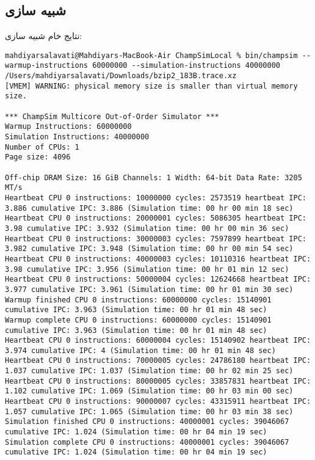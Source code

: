 \documentclass[17pt]{article}
\begin{document}
\subsection{شبیه سازی}
نتایج خام شبیه سازی:

\begin{LTR}
\begin{lstlisting}[basicstyle=\tiny\ttfamily]
mahdiyarsalavati@Mahdiyars-MacBook-Air ChampSimLocal % bin/champsim --warmup-instructions 60000000 --simulation-instructions 40000000 /Users/mahdiyarsalavati/Downloads/bzip2_183B.trace.xz
[VMEM] WARNING: physical memory size is smaller than virtual memory size.

*** ChampSim Multicore Out-of-Order Simulator ***
Warmup Instructions: 60000000
Simulation Instructions: 40000000
Number of CPUs: 1
Page size: 4096

Off-chip DRAM Size: 16 GiB Channels: 1 Width: 64-bit Data Rate: 3205 MT/s
Heartbeat CPU 0 instructions: 10000000 cycles: 2573519 heartbeat IPC: 3.886 cumulative IPC: 3.886 (Simulation time: 00 hr 00 min 18 sec)
Heartbeat CPU 0 instructions: 20000001 cycles: 5086305 heartbeat IPC: 3.98 cumulative IPC: 3.932 (Simulation time: 00 hr 00 min 36 sec)
Heartbeat CPU 0 instructions: 30000003 cycles: 7597899 heartbeat IPC: 3.982 cumulative IPC: 3.948 (Simulation time: 00 hr 00 min 54 sec)
Heartbeat CPU 0 instructions: 40000003 cycles: 10110316 heartbeat IPC: 3.98 cumulative IPC: 3.956 (Simulation time: 00 hr 01 min 12 sec)
Heartbeat CPU 0 instructions: 50000004 cycles: 12624668 heartbeat IPC: 3.977 cumulative IPC: 3.961 (Simulation time: 00 hr 01 min 30 sec)
Warmup finished CPU 0 instructions: 60000000 cycles: 15140901 cumulative IPC: 3.963 (Simulation time: 00 hr 01 min 48 sec)
Warmup complete CPU 0 instructions: 60000000 cycles: 15140901 cumulative IPC: 3.963 (Simulation time: 00 hr 01 min 48 sec)
Heartbeat CPU 0 instructions: 60000004 cycles: 15140902 heartbeat IPC: 3.974 cumulative IPC: 4 (Simulation time: 00 hr 01 min 48 sec)
Heartbeat CPU 0 instructions: 70000005 cycles: 24786180 heartbeat IPC: 1.037 cumulative IPC: 1.037 (Simulation time: 00 hr 02 min 25 sec)
Heartbeat CPU 0 instructions: 80000005 cycles: 33857831 heartbeat IPC: 1.102 cumulative IPC: 1.069 (Simulation time: 00 hr 03 min 00 sec)
Heartbeat CPU 0 instructions: 90000007 cycles: 43315911 heartbeat IPC: 1.057 cumulative IPC: 1.065 (Simulation time: 00 hr 03 min 38 sec)
Simulation finished CPU 0 instructions: 40000001 cycles: 39046067 cumulative IPC: 1.024 (Simulation time: 00 hr 04 min 19 sec)
Simulation complete CPU 0 instructions: 40000001 cycles: 39046067 cumulative IPC: 1.024 (Simulation time: 00 hr 04 min 19 sec)


\end{lstlisting}
\end{LTR}
\end{document}
